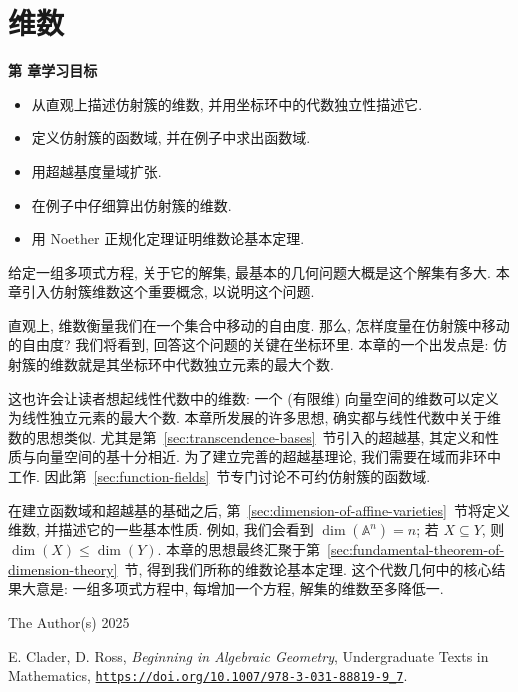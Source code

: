 \chapter{维数}\label{chap:dimension}

\noindent\textbf{第 \thechapter{} 章学习目标}
\begin{itemize}
  \item 从直观上描述仿射簇的维数, 并用坐标环中的代数独立性描述它.
  \item 定义仿射簇的函数域, 并在例子中求出函数域.
  \item 用超越基度量域扩张.
  \item 在例子中仔细算出仿射簇的维数.
  \item 用 Noether 正规化定理证明维数论基本定理.
\end{itemize}

给定一组多项式方程, 关于它的解集, 最基本的几何问题大概是这个解集有多\textquotedbl{}大\textquotedbl{}. 本章引入仿射簇维数这个重要概念, 以说明这个问题.

直观上, 维数衡量我们在一个集合中移动的自由度. 那么, 怎样度量在仿射簇中移动的自由度? 我们将看到, 回答这个问题的关键在坐标环里. 本章的一个出发点是: 仿射簇的维数就是其坐标环中代数独立元素的最大个数.

这也许会让读者想起线性代数中的维数: 一个 (有限维) 向量空间的维数可以定义为线性独立元素的最大个数. 本章所发展的许多思想, 确实都与线性代数中关于维数的思想类似. 尤其是第~\ref{sec:transcendence-bases}~节引入的超越基, 其定义和性质与向量空间的基十分相近. 为了建立完善的超越基理论, 我们需要在域而非环中工作. 因此第~\ref{sec:function-fields}~节专门讨论不可约仿射簇的函数域.

在建立函数域和超越基的基础之后, 第~\ref{sec:dimension-of-affine-varieties}~节将定义维数, 并描述它的一些基本性质. 例如, 我们会看到 $\dim(\mathbb{A}^{n})=n$; 若 $X\subseteq Y$, 则 $\dim(X)\leq\dim(Y)$. 本章的思想最终汇聚于第~\ref{sec:fundamental-theorem-of-dimension-theory}~节, 得到我们所称的维数论基本定理. 这个代数几何中的核心结果大意是: 一组多项式方程中, 每增加一个方程, 解集的维数至多降低一.

\par\smallskip
{\footnotesize
\noindent\textcopyright{} The Author(s) 2025\par
\noindent E. Clader, D. Ross, \emph{Beginning in Algebraic Geometry}, Undergraduate Texts in Mathematics,
\href{https://doi.org/10.1007/978-3-031-88819-9_7}{\nolinkurl{https://doi.org/10.1007/978-3-031-88819-9_7}}.\par}

